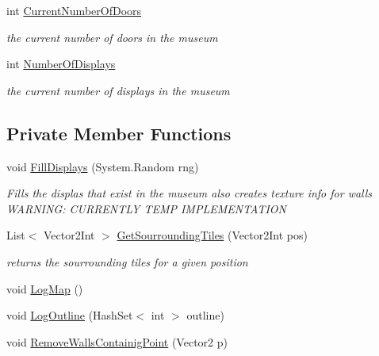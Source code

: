 \begin{DoxyCompactItemize}
int \mbox{\hyperlink{class_museum_ab814feb2d391ec372dfc3a6c6c61c51f}{Current\+Number\+Of\+Doors}}
\begin{DoxyCompactList}\small\item\em the current number of doors in the museum \end{DoxyCompactList}\item 
int \mbox{\hyperlink{class_museum_ac6942612f3be979812b450ee9140caf1}{Number\+Of\+Displays}}
\begin{DoxyCompactList}\small\item\em the current number of displays in the museum \end{DoxyCompactList}\end{DoxyCompactItemize}
\subsection*{Private Member Functions}
\begin{DoxyCompactItemize}
\item 
void \mbox{\hyperlink{class_museum_ae07741bc8fd7f97c84fed0050e18c3c4}{Fill\+Displays}} (System.\+Random rng)
\begin{DoxyCompactList}\small\item\em Fills the displas that exist in the museum also creates texture info for walls W\+A\+R\+N\+I\+NG\+: C\+U\+R\+R\+E\+N\+T\+LY T\+E\+MP I\+M\+P\+L\+E\+M\+E\+N\+T\+A\+T\+I\+ON \end{DoxyCompactList}\item 
List$<$ Vector2\+Int $>$ \mbox{\hyperlink{class_museum_af5b732fe3a0821d02852171a73cf8f8b}{Get\+Sourrounding\+Tiles}} (Vector2\+Int pos)
\begin{DoxyCompactList}\small\item\em returns the sourrounding tiles for a given position \end{DoxyCompactList}\item 
void \mbox{\hyperlink{class_museum_a6a161feedcbb8a471eb0e68b7e3e4027}{Log\+Map}} ()
\item 
void \mbox{\hyperlink{class_museum_a237d1ccf7cb53c4db64647b6addc6576}{Log\+Outline}} (Hash\+Set$<$ int $>$ outline)
\item 
void \mbox{\hyperlink{class_museum_a6b395af086d9773720b1cb5536f405a8}{Remove\+Walls\+Containig\+Point}} (Vector2 p)
\end{DoxyCompactItemize}
